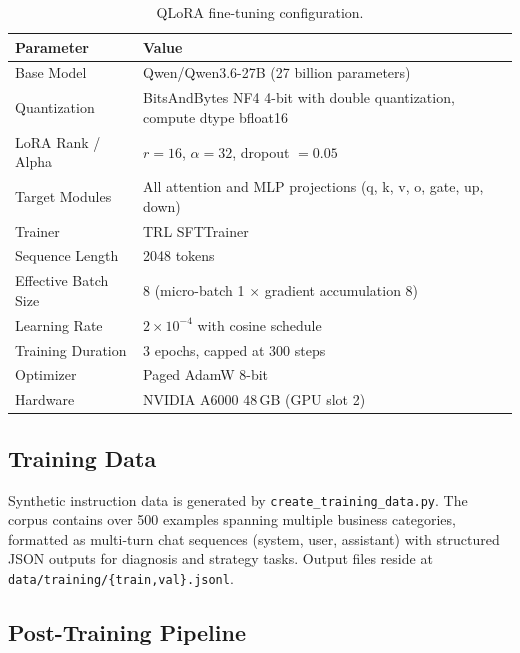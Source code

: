 \documentclass[11pt, a4paper]{article}
\begin{document}
\begin{table}[H]
\centering
\caption{QLoRA fine-tuning configuration.}
\label{tab:finetune}
\renewcommand{\arraystretch}{1.35}
\begin{tabularx}{\textwidth}{M{3.6cm} L}
\toprule
\textbf{Parameter}       & \textbf{Value} \\
\midrule
Base Model               & Qwen/Qwen3.6-27B (27 billion parameters) \\
Quantization             & BitsAndBytes NF4 4-bit with double quantization,
                           compute dtype bfloat16 \\
LoRA Rank / Alpha        & $r = 16$, $\alpha = 32$, dropout $= 0.05$ \\
Target Modules           & All attention and MLP projections
                           (q, k, v, o, gate, up, down) \\
Trainer                  & TRL SFTTrainer \\
Sequence Length           & 2048 tokens \\
Effective Batch Size     & 8 (micro-batch 1 $\times$ gradient accumulation 8) \\
Learning Rate            & $2 \times 10^{-4}$ with cosine schedule \\
Training Duration        & 3 epochs, capped at 300 steps \\
Optimizer                & Paged AdamW 8-bit \\
Hardware                 & NVIDIA A6000 48\,GB (GPU slot 2) \\
\bottomrule
\end{tabularx}
\end{table}


\subsection{Training Data}

Synthetic instruction data is generated by
\texttt{create\_training\_data.py}.
The corpus contains over 500 examples spanning multiple business
categories, formatted as multi-turn chat sequences
(system, user, assistant) with structured JSON outputs for
diagnosis and strategy tasks.
Output files reside at
\texttt{data/training/\{train,val\}.jsonl}.


\subsection{Post-Training Pipeline}
\end{document}
